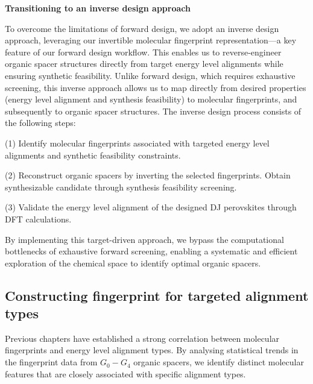 \textbf{Transitioning to an inverse design approach}

To overcome the limitations of forward design, we adopt an inverse design approach, leveraging our invertible molecular fingerprint representation—a key feature of our forward design workflow. This enables us to reverse-engineer organic spacer structures directly from target energy level alignments while ensuring synthetic feasibility.
Unlike forward design, which requires exhaustive screening, this inverse approach allows us to map directly from desired properties (energy level alignment and synthesis feasibility) to molecular fingerprints, and subsequently to organic spacer structures.
The inverse design process consists of the following steps:

(1)	Identify molecular fingerprints associated with targeted energy level alignments and synthetic feasibility constraints.

(2)	Reconstruct organic spacers by inverting the selected fingerprints. Obtain synthesizable candidate through synthesis feasibility screening.

(3)	Validate the energy level alignment of the designed DJ perovskites through DFT calculations.

By implementing this target-driven approach, we bypass the computational bottlenecks of exhaustive forward screening, enabling a systematic and efficient exploration of the chemical space to identify optimal organic spacers.

\subsection{Constructing fingerprint for targeted alignment types}

Previous chapters have established a strong correlation between molecular fingerprints and energy level alignment types. By analysing statistical trends in the fingerprint data from $G_0-G_4$ organic spacers, we identify distinct molecular features that are closely associated with specific alignment types.



